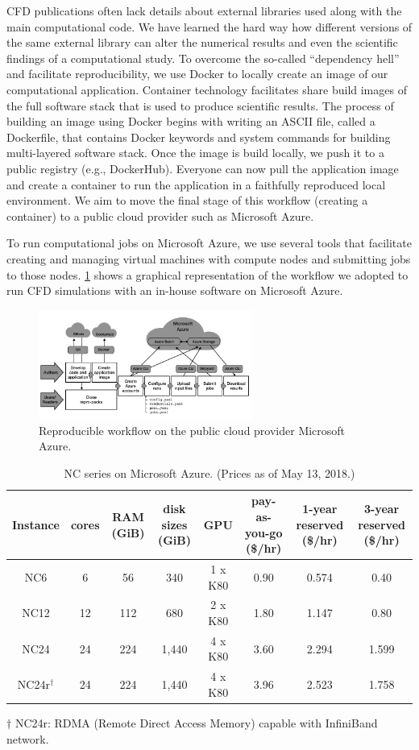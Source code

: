 \documentclass[10pt,journal,compsoc]{IEEEtran}
\begin{document}
CFD publications often lack details about external libraries used along with the main computational code.
We have learned the hard way how different versions of the same external library can alter the numerical results and even the scientific findings of a computational study\cite{mesnard_barba_2017}.
To overcome the so-called ``dependency hell'' and facilitate reproducibility, we use Docker to locally create an image of our computational application.
Container technology facilitates share build images of the full software stack that is used to produce scientific results.
The process of building an image using Docker begins with writing an ASCII file, called a Dockerfile, that contains Docker keywords and system commands for building multi-layered software stack.
Once the image is build locally, we push it to a public registry (e.g., DockerHub).
Everyone can now pull the application image and create a container to run the application in a faithfully reproduced local environment.
We aim to move the final stage of this workflow (creating a container) to a public cloud provider such as Microsoft Azure.

To run computational jobs on Microsoft Azure, we use several tools that facilitate creating and managing virtual machines with compute nodes and submitting jobs to those nodes.
\ref{fig:cloud_workflow} shows a graphical representation of the workflow we adopted to run CFD simulations with an in-house software on Microsoft Azure.

\begin{figure}[!ht]
    \centering
    \includegraphics[width=7cm]{figures/cloud_workflow.png}
    \caption{Reproducible workflow on the public cloud provider Microsoft Azure.}
    \label{fig:cloud_workflow}
\end{figure}

\begin{table}[!t]
    \caption{NC series on Microsoft Azure. (Prices as of May 13, 2018.)}
    \label{tab:nc_series}
    \centering
    \begin{tabular}{cccccccc}
        Instance & cores & RAM (GiB) & disk sizes (GiB) & GPU & pay-as-you-go (\$/hr) & 1-year reserved (\$/hr) & 3-year reserved (\$/hr) \\
        \hline
        NC6 & 6 & 56 & 340 & 1 x K80 & 0.90 & 0.574 & 0.40 \\
        NC12 & 12 & 112 & 680 & 2 x K80 & 1.80 & 1.147 & 0.80 \\
        NC24 & 24 & 224 & 1,440 & 4 x K80 & 3.60 & 2.294 & 1.599 \\
        NC24r$^\dagger$ & 24 & 224 & 1,440 & 4 x K80 & 3.96 & 2.523 & 1.758 \\
        \hline
    \end{tabular}
    $\dagger$ NC24r: RDMA (Remote Direct Access Memory) capable with InfiniBand network.
\end{table}
\end{document}
